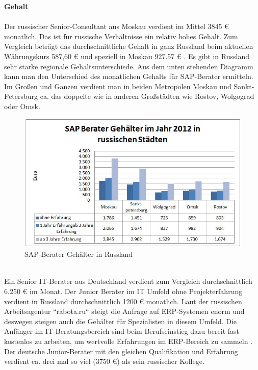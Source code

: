 	\textbf{Gehalt}\\ 
	\\
	Der russischer Senior-Consultant aus Moskau verdient im Mittel 3845 € monatlich. Das ist für russische Verhältnisse ein relativ hohes Gehalt. Zum Vergleich beträgt das durchschnittliche Gehalt in ganz Russland beim aktuellen Währungskurs 587,60 €  und speziell in Moskau 927.57 € \cite{RusGehAllgm}. Es gibt  in Russland sehr starke regionale Gehaltsunterschiede. Aus dem unten stehenden Diagramm kann man den Unterschied des monatlichen Gehalts für SAP-Berater ermitteln. Im Großen und Ganzen verdient man in beiden Metropolen Moskau und Sankt-Petersburg ca. das doppelte wie in anderen Großstädten wie Rostov, Wolgograd oder Omsk.
	\\
\begin{figure}[htp]
\centering
\includegraphics[width=0.7\linewidth]{./images/SAP-Berater_Gehalt_RU}
\caption{SAP-Berater Gehälter in Russland \cite{GehaltSAPBerRU}}
\label{fig:SAP-Berater_Gehalt_RU}
\end{figure}
\\
	Ein Senior IT-Berater aus Deutschland verdient zum Vergleich durchschnittlich 6.250 € im Monat\cite{GehaltSAPBerDE}. Der Junior Berater im IT Umfeld ohne Projekterfahrung  verdient in Russland durchschnittlich 1200 € monatlich\cite{GehaltSAPBerRU}. Laut der russischen Arbeitsagentur ``rabota.ru`` steigt die Anfrage auf ERP-Systemen enorm und deswegen steigen auch die Gehälter für Spezialisten in diesem Umfeld. Die Anfänger im IT-Beratungsbereich sind beim Berufseinstieg dazu bereit fast kostenlos zu arbeiten, um wertvolle Erfahrungen im ERP-Bereich zu sammeln \cite{RusGehRabota}.
	Der deutsche Junior-Berater mit den gleichen Qualifikation und Erfahrung verdient ca. drei mal so viel (3750 €) \cite{GehaltSAPBerDE} als sein russischer Kollege.\\ \\
